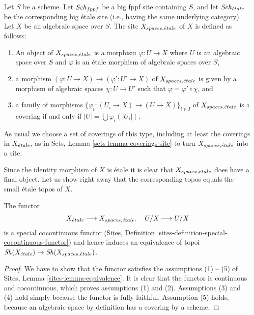 \begin{definition}
\label{definition-spaces-etale-site}
Let $S$ be a scheme.
Let $\mathit{Sch}_{fppf}$ be a big fppf site containing $S$,
and let $\mathit{Sch}_{\acute{e}tale}$ be the corresponding big \'etale site
(i.e., having the same underlying category).
Let $X$ be an algebraic space over $S$.
The site {\it $X_{spaces, {\acute{e}tale}}$} of $X$ is defined as follows:
\begin{enumerate}
\item An object of $X_{spaces, {\acute{e}tale}}$ is a morphism
$\varphi : U \to X$ where $U$ is an algebraic space over $S$ and
$\varphi$ is an \'etale morphism of algebraic spaces over $S$,
\item a morphism $(\varphi : U \to X) \to (\varphi' : U' \to X)$ of
$X_{spaces, {\acute{e}tale}}$ is given by a morphism of algebraic spaces
$\chi : U \to U'$ such that $\varphi = \varphi' \circ \chi$, and
\item a family of morphisms
$\{\varphi_i : (U_i \to X) \to (U \to X)\}_{i \in I}$
of $X_{spaces, {\acute{e}tale}}$ is a covering if and only if
$|U| = \bigcup \varphi_i(|U_i|)$.
\end{enumerate}
As usual we choose a set of coverings of this type, including at least
the coverings in $X_{\acute{e}tale}$, as in
Sets, Lemma \ref{sets-lemma-coverings-site}
to turn $X_{spaces, {\acute{e}tale}}$ into a site.
\end{definition}

\noindent
Since the identity morphism of $X$ is \'etale it is clear that
$X_{spaces, {\acute{e}tale}}$ does have a final object.
Let us show right away that the corresponding topos equals the
small \'etale topos of $X$.

\begin{lemma}
\label{lemma-compare-etale-sites}
The functor
$$
X_{\acute{e}tale} \longrightarrow X_{spaces, {\acute{e}tale}}, \quad
U/X \longmapsto U/X
$$
is a special cocontinuous functor
(Sites, Definition \ref{sites-definition-special-cocontinuous-functor})
and hence induces an equivalence of topoi
$\mathop{\mathit{Sh}}\nolimits(X_{\acute{e}tale}) \to \mathop{\mathit{Sh}}\nolimits(X_{spaces, {\acute{e}tale}})$.
\end{lemma}

\begin{proof}
We have to show that the functor satisfies the assumptions (1) -- (5) of
Sites, Lemma \ref{sites-lemma-equivalence}.
It is clear that the functor is continuous and cocontinuous, which
proves assumptions (1) and (2).
Assumptions (3) and (4) hold simply because the functor is fully faithful.
Assumption (5) holds, because an algebraic space by definition has
a covering by a scheme.
\end{proof}

